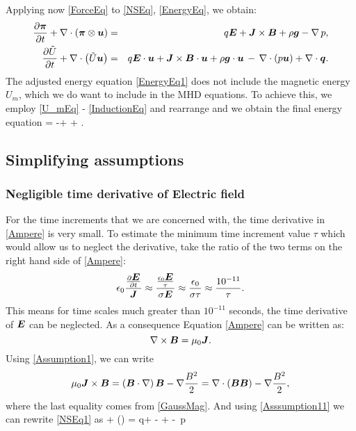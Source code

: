 Applying now \ref{ForceEq} to \ref{NSEq}, \ref{EnergyEq}, we obtain:
\begin{eqnarray}
\label{NSEq1} \frac{\partial{\mbox{\boldmath $\pi$}}}{\partial{t}} + \nabla\cdot\left(\mbox{\boldmath $\pi$}\otimes\mbox{\boldmath $u$}\right)& = & q\mbox{\boldmath $E$} + \mbox{\boldmath $J$}\times\mbox{\boldmath $B$} + \rho\mbox{\boldmath $g$} - \nabla\,p,\\
\label{EnergyEq1} \frac{\partial{\tilde{U}}}{\partial{t}} + \nabla\cdot\left({\tilde{U}}\mbox{\boldmath $u$}\right) & = & q\mbox{\boldmath $E$}\cdot\mbox{\boldmath $u$} + \mbox{\boldmath $J$}\times\mbox{\boldmath $B$}\cdot\mbox{\boldmath $u$} + \rho\mbox{\boldmath $g$}\cdot\mbox{\boldmath $u$} \,-\,\nabla\cdot\left({p}\mbox{\boldmath $u$}\right) + \nabla\cdot\mbox{\boldmath $q$}.
\end{eqnarray}
The adjusted energy equation \ref{EnergyEq1} does not include the magnetic energy $U_m$, which we do want to include in the MHD equations. To achieve this, we employ \ref{U_mEq} - \ref{InductionEq} and rearrange and we obtain the final energy equation
\be
\label{EnergyEqPrefinal}  = -\nabla\cdot{} + \rho \bfg \cdot \bfu + \nabla\cdot\bfq.
\ee

\subsection{Simplifying assumptions}
\subsubsection{Negligible time derivative of Electric field}
For the time increments that we are concerned with, the time derivative in \ref{Ampere} is
very small. To estimate the minimum time increment value $\tau$ which would allow us to neglect the derivative, take the ratio of the two terms on the right hand side of \ref{Ampere}:
\begin{equation}
\epsilon_0 \frac{\frac{\partial{\mbox{\boldmath $E$}}}{\partial{t}}}{\mbox{\boldmath $J$}} \approx \frac{\frac{\epsilon_0 \mbox{\boldmath $E$}}{\tau}}{\sigma\mbox{\boldmath $E$}} \approx \frac{\epsilon_0}{\sigma \tau} \approx \frac{10^{-11}}{\tau}.
\end{equation}
This means for time scales much greater than $10^{-11}$ seconds, the time derivative of $\mbox{\boldmath $E$}$ can be neglected. As a consequence Equation \ref{Ampere} can be written as:
\begin{equation}
\label{Assumption1} \nabla \times \mbox{\boldmath $B$} = \mu_0 \mbox{\boldmath $J$}.
\end{equation}
Using \ref{Assumption1}, we can write
\begin{equation}
\label{Asssumption11} \mu_0 \mbox{\boldmath $J$} \times \mbox{\boldmath $B$} = \left(\mbox{\boldmath $B$}\cdot\nabla\right)\mbox{\boldmath $B$} - \nabla\frac{B^2}{2} = \nabla\cdot\left(\mbox{\boldmath $B$}\mbox{\boldmath $B$}\right) - \nabla\frac{B^2}{2},
\end{equation}
where the last equality comes from \ref{GaussMag}. And using \ref{Asssumption11} we can rewrite \ref{NSEq1} as
\be
\label{NSEq2}  + \nabla\cdot\left(\bfpi\otimes\bfu\right) =  q\bfE + \nabla\cdot\lo{}\bfB\bfB - \ro + \rho\bfg - \nabla\,p
\ee

